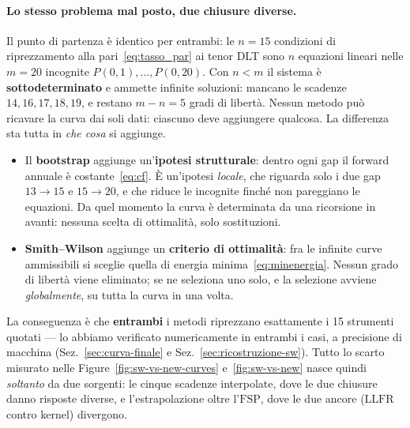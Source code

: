 \documentclass[11pt,a4paper]{article}
\theoremstyle{plain}
\theoremstyle{definition}
\theoremstyle{remark}
\newcommand{\LLFR}{\mathrm{LLFR}}
\newcommand{\FSP}{\mathrm{FSP}}
\begin{document}
\paragraph{Lo stesso problema mal posto, due chiusure diverse.}
Il punto di partenza \`e identico per entrambi: le $n=15$ condizioni di riprezzamento alla
pari~\eqref{eq:tasso_par} ai tenor DLT sono $n$ equazioni lineari nelle $m=20$ incognite
$P(0,1),\ldots,P(0,20)$. Con $n<m$ il sistema \`e \textbf{sottodeterminato} e ammette infinite
soluzioni: mancano le scadenze $14,16,17,18,19$, e restano $m-n=5$ gradi di libert\`a. Nessun
metodo pu\`o ricavare la curva dai soli dati: ciascuno deve aggiungere qualcosa. La differenza
sta tutta in \emph{che cosa} si aggiunge.
\begin{itemize}
  \item Il \textbf{bootstrap} aggiunge un'\textbf{ipotesi strutturale}: dentro ogni gap il
        forward annuale \`e costante~\eqref{eq:cf}. \`E un'ipotesi \emph{locale}, che
        riguarda solo i due gap $13\!\to\!15$ e $15\!\to\!20$, e che riduce le incognite
        finch\'e non pareggiano le equazioni. Da quel momento la curva \`e determinata da una
        ricorsione in avanti: nessuna scelta di ottimalit\`a, solo sostituzioni.
  \item \textbf{Smith--Wilson} aggiunge un \textbf{criterio di ottimalit\`a}: fra le infinite
        curve ammissibili si sceglie quella di energia minima~\eqref{eq:minenergia}. Nessun
        grado di libert\`a viene eliminato; se ne seleziona uno solo, e la selezione avviene
        \emph{globalmente}, su tutta la curva in una volta.
\end{itemize}
La conseguenza \`e che \textbf{entrambi} i metodi riprezzano esattamente i 15 strumenti
quotati --- lo abbiamo verificato numericamente in entrambi i casi, a precisione di macchina
(Sez.~\ref{sec:curva-finale} e Sez.~\ref{sec:ricostruzione-sw}). Tutto lo scarto misurato
nelle Figure~\ref{fig:sw-vs-new-curves} e~\ref{fig:sw-vs-new} nasce quindi \emph{soltanto} da
due sorgenti: le cinque scadenze interpolate, dove le due chiusure danno risposte diverse, e
l'estrapolazione oltre l'$\FSP$, dove le due ancore ($\LLFR$ contro kernel) divergono.
\end{document}
